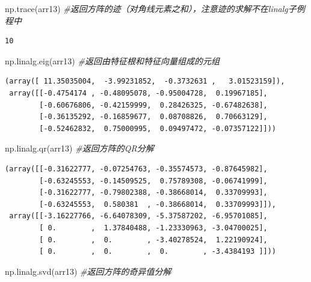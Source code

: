 \documentclass[]{article}
\newenvironment{Shaded}{\begin{snugshade}}{\end{snugshade}}
\newcommand{\CommentTok}[1]{\textcolor[rgb]{0.56,0.35,0.01}{\textit{#1}}}
\newcommand{\NormalTok}[1]{#1}
\begin{document}
\begin{Shaded}
\begin{Highlighting}[]
\NormalTok{np.trace(arr13) }\CommentTok{#返回方阵的迹（对角线元素之和），注意迹的求解不在linalg子例程中}
\end{Highlighting}
\end{Shaded}

\begin{verbatim}
10
\end{verbatim}

\begin{Shaded}
\begin{Highlighting}[]
\NormalTok{np.linalg.eig(arr13) }\CommentTok{#返回由特征根和特征向量组成的元组}
\end{Highlighting}
\end{Shaded}

\begin{verbatim}
(array([ 11.35035004,  -3.99231852,  -0.3732631 ,   3.01523159]),
 array([[-0.4754174 , -0.48095078, -0.95004728,  0.19967185],
        [-0.60676806, -0.42159999,  0.28426325, -0.67482638],
        [-0.36135292, -0.16859677,  0.08708826,  0.70663129],
        [-0.52462832,  0.75000995,  0.09497472, -0.07357122]]))
\end{verbatim}

\begin{Shaded}
\begin{Highlighting}[]
\NormalTok{np.linalg.qr(arr13) }\CommentTok{#返回方阵的QR分解}
\end{Highlighting}
\end{Shaded}

\begin{verbatim}
(array([[-0.31622777, -0.07254763, -0.35574573, -0.87645982],
        [-0.63245553, -0.14509525,  0.75789308, -0.06741999],
        [-0.31622777, -0.79802388, -0.38668014,  0.33709993],
        [-0.63245553,  0.580381  , -0.38668014,  0.33709993]]),
 array([[-3.16227766, -6.64078309, -5.37587202, -6.95701085],
        [ 0.        ,  1.37840488, -1.23330963, -3.04700025],
        [ 0.        ,  0.        , -3.40278524,  1.22190924],
        [ 0.        ,  0.        ,  0.        , -3.4384193 ]]))
\end{verbatim}

\begin{Shaded}
\begin{Highlighting}[]
\NormalTok{np.linalg.svd(arr13) }\CommentTok{#返回方阵的奇异值分解}
\end{Highlighting}
\end{Shaded}
\end{document}
